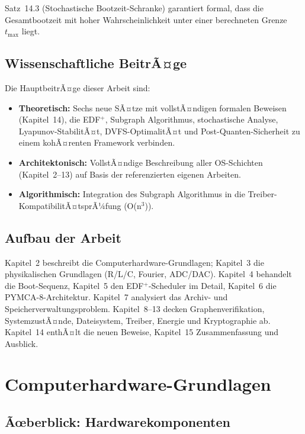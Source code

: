 ﻿\documentclass[a4paper,12pt]{scrreprt}
\theoremstyle{definition}
\begin{document}
	Satz~14.3 (Stochastische Bootzeit-Schranke) garantiert formal, dass die
	Gesamtbootzeit mit hoher Wahrscheinlichkeit unter einer berechneten Grenze
	$t_{\max}$ liegt.
	
	\section{Wissenschaftliche BeitrÃ¤ge}
	
	Die HauptbeitrÃ¤ge dieser Arbeit sind:
	
	\begin{itemize}
		\item \textbf{Theoretisch:} Sechs neue SÃ¤tze mit vollstÃ¤ndigen formalen Beweisen
		(Kapitel~14), die EDF$^+$, Subgraph Algorithmus, stochastische Analyse,
		Lyapunov-StabilitÃ¤t, DVFS-OptimalitÃ¤t und Post-Quanten-Sicherheit
		zu einem kohÃ¤renten Framework verbinden.
		\item \textbf{Architektonisch:} VollstÃ¤ndige Beschreibung aller OS-Schichten
		(Kapitel~2--13) auf Basis der referenzierten eigenen Arbeiten.
		\item \textbf{Algorithmisch:} Integration des Subgraph Algorithmus
		\cite{Epp2026subgraph} in die Treiber-Kompatibi\-litÃ¤tsprÃ¼fung (O(n$^3$)).
	\end{itemize}
	
	\section{Aufbau der Arbeit}
	
	Kapitel~2 beschreibt die Computerhardware-Grundlagen; Kapitel~3 die
	physikalischen Grundlagen (R/L/C, Fourier, ADC/DAC). Kapitel~4 behandelt die
	Boot-Sequenz, Kapitel~5 den EDF$^+$-Scheduler im Detail,
	Kapitel~6 die PYMCA-8-Architektur. Kapitel~7 analysiert das Archiv- und
	Speicherverwaltungsproblem. Kapitel~8--13 decken Graphenverifikation,
	SystemzustÃ¤nde, Dateisystem, Treiber, Energie und Kryptographie ab.
	Kapitel~14 enthÃ¤lt die neuen Beweise, Kapitel~15 Zusammenfassung und Ausblick.
	
	\chapter{Computerhardware-Grundlagen}
	
	\section{Ãœberblick: Hardwarekomponenten}
	
\end{document}
